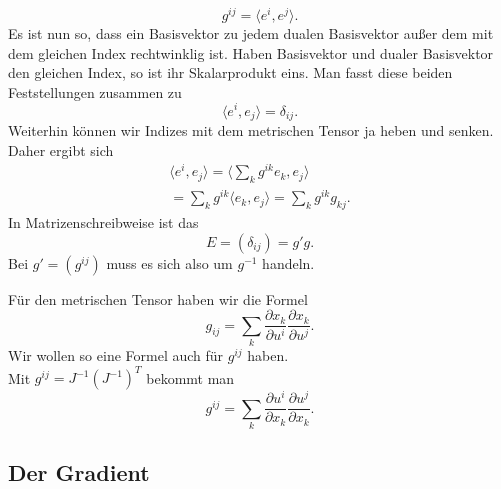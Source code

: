 \documentclass[a4paper,11pt,fleqn,twocolumn,twoside]{scrartcl}
\numberwithin{equation}{section}
\begin{document}
\begin{equation}
g^{ij} = \langle e^i, e^j\rangle.
\end{equation}
Es ist nun so, dass ein Basisvektor zu jedem dualen Basisvektor außer
dem mit dem gleichen Index rechtwinklig ist. Haben Basisvektor und
dualer Basisvektor den gleichen Index, so ist ihr Skalarprodukt eins.
Man fasst diese beiden Feststellungen zusammen zu
\begin{equation}
\langle e^i,e_j\rangle = \delta_{ij}.
\end{equation}
%
Weiterhin können wir Indizes mit dem metrischen Tensor ja heben und
senken. Daher ergibt sich
\begin{gather*}\langle e^i,e_j\rangle
= \langle \sum_{k} g^{ik}e_k,e_j\rangle\\
= \sum_{k}g^{ik}\langle e_k,e_j\rangle
= \sum_{k}g^{ik}g_{kj}.
\end{gather*}
In Matrizenschreibweise ist das
\begin{equation}
E = (\delta_{ij}) =  g'g.
\end{equation}
Bei $g'=(g^{ij})$ muss es sich also um $g^{-1}$ handeln.

Für den metrischen Tensor haben wir die Formel
\begin{equation}
g_{ij} = \sum_{k} \frac{\partial x_k}{\partial u^i}
\frac{\partial x_k}{\partial u^j}.
\end{equation}
Wir wollen so eine Formel auch für $g^{ij}$ haben.\\
Mit $g^{ij}=J^{-1}(J^{-1})^T$ bekommt man
\begin{equation}
g^{ij} = \sum_{k} \frac{\partial u^i}{\partial x_k}
\frac{\partial u^j}{\partial x_k}.
\end{equation}

\subsection{Der Gradient}
\end{document}
